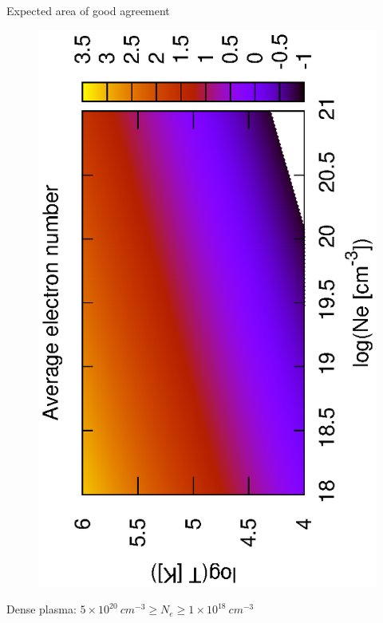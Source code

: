 \documentclass{beamer}
\begin{document}
\begin{frame}{Expected area of good agreement}
\begin{figure}
    \includegraphics[scale=0.40,angle=-90]{fig/color_N.eps}
\end{figure}
Dense plasma: $5 \times 10^{20} \ cm^{-3} \ge N_e \ge 1 \times 10^{18}\ cm^{-3}$
\end{frame}
\end{document}

